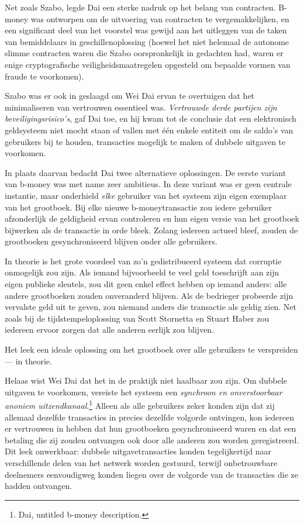 \documentclass[
  a5paper,
  smalldemyvopaper,11pt,twoside,onecolumn,openright,extrafontsizes,
hidelinks]{memoir}
\begin{document}
Net zoals Szabo, legde Dai een sterke nadruk op het belang van
contracten. B-money was ontworpen om de uitvoering van contracten te
vergemakkelijken, en een significant deel van het voorstel was gewijd
aan het uitleggen van de taken van bemiddelaars in geschillenoplossing
(hoewel het niet helemaal de autonome slimme contracten waren die Szabo
oorspronkelijk in gedachten had, waren er enige cryptografische
veiligheidsmaatregelen opgesteld om bepaalde vormen van fraude te
voorkomen).

Szabo was er ook in geslaagd om Wei Dai ervan te overtuigen dat het
minimaliseren van vertrouwen essentieel was. \emph{Vertrouwde derde
partijen zijn beveiligingsrisico's}, gaf Dai toe, en hij kwam tot de
conclusie dat een elektronisch geldsysteem niet mocht staan of vallen
met één enkele entiteit om de saldo's van gebruikers bij te houden,
transacties mogelijk te maken of dubbele uitgaven te voorkomen.

In plaats daarvan bedacht Dai twee alternatieve oplossingen. De eerste
variant van b-money was met name zeer ambitieus. In deze variant was er
geen centrale instantie, maar onderhield \emph{elke} gebruiker van het
systeem zijn eigen exemplaar van het grootboek. Bij elke nieuwe
b-moneytransactie zou iedere gebruiker afzonderlijk de geldigheid ervan
controleren en hun eigen versie van het grootboek bijwerken als de
transactie in orde bleek. Zolang iedereen actueel bleef, zouden de
grootboeken gesynchroniseerd blijven onder alle gebruikers.

In theorie is het grote voordeel van zo'n gedistribueerd systeem dat
corruptie onmogelijk zou zijn. Als iemand bijvoorbeeld te veel geld
toeschrijft aan zijn eigen publieke sleutels, zou dit geen enkel effect
hebben op iemand anders: alle andere grootboeken zouden onveranderd
blijven. Als de bedrieger probeerde zijn vervalste geld uit te geven,
zou niemand anders die transactie als geldig zien. Net zoals bij de
tijdstempeloplossing van Scott Stornetta en Stuart Haber zou iedereen
ervoor zorgen dat alle anderen eerlijk zou blijven.

Het leek een ideale oplossing om het grootboek over alle gebruikers te
verspreiden --- in theorie.

Helaas wist Wei Dai dat het in de praktijk niet haalbaar zou zijn. Om
dubbele uitgaven te voorkomen, vereiste het systeem een \emph{synchroon
en onverstoorbaar anoniem uitzendkanaal}.\footnote{Dai, untitled b-money
  description.} Alleen als alle gebruikers zeker konden zijn dat zij
allemaal dezelfde transacties in precies dezelfde volgorde ontvingen,
kon iedereen er vertrouwen in hebben dat hun grootboeken
gesynchroniseerd waren en dat een betaling die zij zouden ontvangen ook
door alle anderen zou worden geregistreerd. Dit leek onwerkbaar: dubbele
uitgavetransacties konden tegelijkertijd naar verschillende delen van
het netwerk worden gestuurd, terwijl onbetrouwbare deelnemers
eenvoudigweg konden liegen over de volgorde van de transacties die ze
hadden ontvangen.
\end{document}
